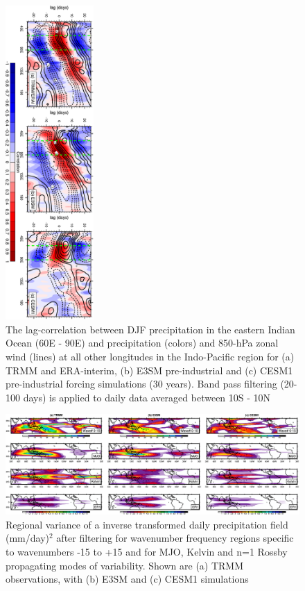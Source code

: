 \documentclass[draft,ms]{AGUTeX}
\begin{document}
\begin{article}
\begin{figure}[t]
  \begin{center}
    \noindent\includegraphics[width=0.3\textwidth,angle=90.]{./figs/f_lagcorr_djf.pdf}
  \end{center}
  \caption{The lag-correlation between DJF precipitation in the eastern Indian Ocean (60\deg E - 90\deg E) and precipitation (colors) and 850-hPa zonal wind (lines) at all other longitudes in the Indo-Pacific region for (a) TRMM and ERA-interim, (b) E3SM pre-industrial and (c) CESM1 pre-industrial forcing simulations (30 years). Band pass filtering (20-100 days) is applied to daily data averaged between 10\deg S - 10\deg N} 
\label{f_lagcorr_djf}
\end{figure}

\begin{figure}[t]
  \begin{center}
    \noindent\includegraphics[width=1.1\textwidth,angle=0.]{./figs/f_wave_var_DJF_PRECT.pdf}
  \end{center}
  \caption{Regional variance of a inverse transformed daily precipitation field (mm/day)$^2$ after filtering for wavenumber frequency regions specific to wavenumbers -15 to +15 and for MJO, Kelvin and n=1 Rossby propagating modes of variability. Shown are (a) TRMM observations, with (b) E3SM and (c) CESM1 simulations} 
\label{f_wave_var_DJF_PRECT}
\end{figure}


\end{article}
\end{document}
